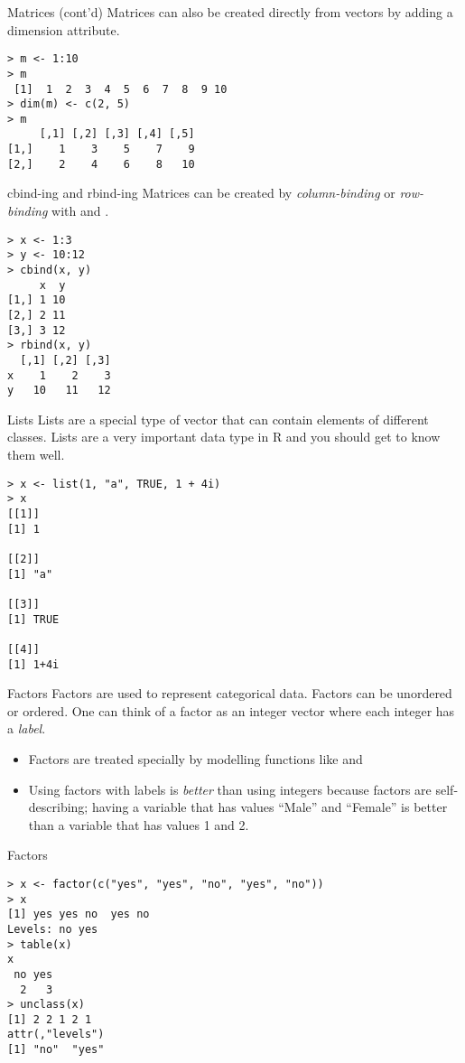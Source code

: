 \documentclass[aspectratio=169]{beamer}
\begin{document}
\begin{frame}[fragile]{Matrices (cont'd)}
Matrices can also be created directly from vectors by adding a
dimension attribute.
\begin{verbatim}
> m <- 1:10
> m
 [1]  1  2  3  4  5  6  7  8  9 10
> dim(m) <- c(2, 5)
> m
     [,1] [,2] [,3] [,4] [,5]
[1,]    1    3    5    7    9
[2,]    2    4    6    8   10
\end{verbatim}
\end{frame}

\begin{frame}[fragile]{cbind-ing and rbind-ing}
Matrices can be created by \textit{column-binding} or
\textit{row-binding} with  and .
\begin{verbatim}
> x <- 1:3
> y <- 10:12
> cbind(x, y)
     x  y
[1,] 1 10
[2,] 2 11
[3,] 3 12
> rbind(x, y)
  [,1] [,2] [,3]
x    1    2    3
y   10   11   12
\end{verbatim}
\end{frame}

\begin{frame}[fragile]{Lists}
Lists are a special type of vector that can contain elements of
different classes.  Lists are a very important data type in R and you
should get to know them well.
\begin{verbatim}
> x <- list(1, "a", TRUE, 1 + 4i)
> x
[[1]]
[1] 1

[[2]]
[1] "a"

[[3]]
[1] TRUE

[[4]]
[1] 1+4i
\end{verbatim}
\end{frame}

\begin{frame}{Factors}
Factors are used to represent categorical data.  Factors can be
unordered or ordered.  One can think of a factor as an integer vector
where each integer has a \textit{label}.
\begin{itemize}
\item
Factors are treated specially by modelling functions like 
and 
\item
Using factors with labels is \textit{better} than using integers
because factors are self-describing; having a variable that has values
``Male'' and ``Female'' is better than a variable that has values 1
and 2.
\end{itemize}
\end{frame}

\begin{frame}[fragile]{Factors}
\begin{verbatim}
> x <- factor(c("yes", "yes", "no", "yes", "no"))
> x
[1] yes yes no  yes no 
Levels: no yes
> table(x)
x
 no yes 
  2   3 
> unclass(x)
[1] 2 2 1 2 1
attr(,"levels")
[1] "no"  "yes"
\end{verbatim}
\end{frame}
\end{document}

